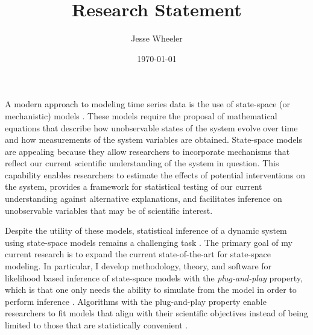 \documentclass{article}
\title{Research Statement}
\author{Jesse Wheeler}
\date{\today}
\begin{document}
\rule{0mm}{1mm}
\vspace{-20mm}


\vspace{1mm}

\rule{0mm}{1mm}

\vspace{3mm}
\rule{0mm}{1mm}

\vspace{4mm}

\noindent A modern approach to modeling time series data is the use of state-space (or mechanistic) models \cite{durbin12}.
These models require the proposal of mathematical equations that describe how unobservable states of the system evolve over time and how measurements of the system variables are obtained.
State-space models are appealing because they allow researchers to incorporate mechanisms that reflect our current scientific understanding of the system in question.
This capability enables researchers to estimate the effects of potential interventions on the system, provides a framework for statistical testing of our current understanding against alternative explanations, and facilitates inference on unobservable variables that may be of scientific interest.

Despite the utility of these models, statistical inference of a dynamic system using state-space models remains a challenging task \cite{auger16}.
The primary goal of my current research is to expand the current state-of-the-art for state-space modeling.
In particular, I develop methodology, theory, and software for likelihood based inference of state-space models with the {\it plug-and-play} property, which is that one only needs the ability to simulate from the model in order to perform inference \cite{breto09}.
Algorithms with the plug-and-play property enable researchers to fit models that align with their scientific objectives instead of being limited to those that are statistically convenient \cite{wheeler24}.

\end{document}
